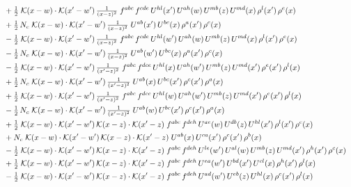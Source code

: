 \documentclass[9pt]{article}
\begin{document}
\begin{align}
&\quad +\tfrac{1}{2}\;\mathcal{K}(x-w)\cdot\mathcal{K}(x'-w')\,\tfrac{1}{(x-z)^{2}}\;f^{abc}\,f^{cde}\,U^{hl}(x')\,U^{ah}(w)\,U^{mb}(z)\,U^{md}(x)\,\rho^{l}(x')\,\rho^{e}(x)\notag\\
&\quad +\tfrac{1}{2}\,N_c\;\mathcal{K}(x-w)\cdot\mathcal{K}(x'-w')\,\tfrac{1}{(x-z)^{2}}\;U^{ab}(x')\,U^{bc}(x)\,\rho^{a}(x')\,\rho^{c}(x)\notag\\
&\quad -\tfrac{1}{2}\;\mathcal{K}(x-w)\cdot\mathcal{K}(x'-w')\,\tfrac{1}{(x-z)^{2}}\;f^{abc}\,f^{cde}\,U^{hl}(w')\,U^{ah}(w)\,U^{mb}(z)\,U^{md}(x)\,\rho^{l}(x')\,\rho^{e}(x)\notag\\
&\quad -\tfrac{1}{2}\,N_c\;\mathcal{K}(x-w)\cdot\mathcal{K}(x'-w')\,\tfrac{1}{(x-z)^{2}}\;U^{ab}(w')\,U^{bc}(x)\,\rho^{a}(x')\,\rho^{c}(x)\notag\\
&\quad -\tfrac{1}{2}\;\mathcal{K}(x-w)\cdot\mathcal{K}(x'-w')\,\tfrac{1}{(x'-z)^{2}}\;f^{abc}\,f^{dce}\,U^{hl}(x)\,U^{ah}(w')\,U^{mb}(z)\,U^{md}(x')\,\rho^{e}(x')\,\rho^{l}(x)\notag\\
&\quad +\tfrac{1}{2}\,N_c\;\mathcal{K}(x-w)\cdot\mathcal{K}(x'-w')\,\tfrac{1}{(x'-z)^{2}}\;U^{ab}(x)\,U^{bc}(x')\,\rho^{c}(x')\,\rho^{a}(x)\notag\\
&\quad +\tfrac{1}{2}\;\mathcal{K}(x-w)\cdot\mathcal{K}(x'-w')\,\tfrac{1}{(x'-z)^{2}}\;f^{abc}\,f^{dce}\,U^{hl}(w)\,U^{ah}(w')\,U^{mb}(z)\,U^{md}(x')\,\rho^{e}(x')\,\rho^{l}(x)\notag\\
&\quad -\tfrac{1}{2}\,N_c\;\mathcal{K}(x-w)\cdot\mathcal{K}(x'-w')\,\tfrac{1}{(x'-z)^{2}}\;U^{ab}(w)\,U^{bc}(x')\,\rho^{c}(x')\,\rho^{a}(x)\notag\\
&\quad +\tfrac{1}{2}\;\mathcal{K}(x-w)\cdot\mathcal{K}(x'-w')\,\mathcal{K}(x-z)\cdot\mathcal{K}(x'-z)\;f^{abc}\,f^{deh}\,U^{ae}(w)\,U^{db}(z)\,U^{hl}(x')\,\rho^{l}(x')\,\rho^{c}(x)\notag\\
&\quad +N_c\;\mathcal{K}(x-w)\cdot\mathcal{K}(x'-w')\,\mathcal{K}(x-z)\cdot\mathcal{K}(x'-z)\;U^{ab}(x)\,U^{ca}(x')\,\rho^{c}(x')\,\rho^{b}(x)\notag\\
&\quad -\tfrac{1}{2}\;\mathcal{K}(x-w)\cdot\mathcal{K}(x'-w')\,\mathcal{K}(x-z)\cdot\mathcal{K}(x'-z)\;f^{abc}\,f^{deh}\,U^{le}(w')\,U^{al}(w)\,U^{mb}(z)\,U^{md}(x')\,\rho^{h}(x')\,\rho^{c}(x)\notag\\
&\quad +\tfrac{1}{2}\;\mathcal{K}(x-w)\cdot\mathcal{K}(x'-w')\,\mathcal{K}(x-z)\cdot\mathcal{K}(x'-z)\;f^{abc}\,f^{deh}\,U^{ea}(w')\,U^{bd}(x')\,U^{cl}(x)\,\rho^{h}(x')\,\rho^{l}(x)\notag\\
&\quad -\tfrac{1}{2}\;\mathcal{K}(x-w)\cdot\mathcal{K}(x'-w')\,\mathcal{K}(x-z)\cdot\mathcal{K}(x'-z)\;f^{abc}\,f^{deh}\,U^{ad}(w')\,U^{eb}(z)\,U^{hl}(x)\,\rho^{c}(x')\,\rho^{l}(x)\notag\\

\end{align}
\end{document}
